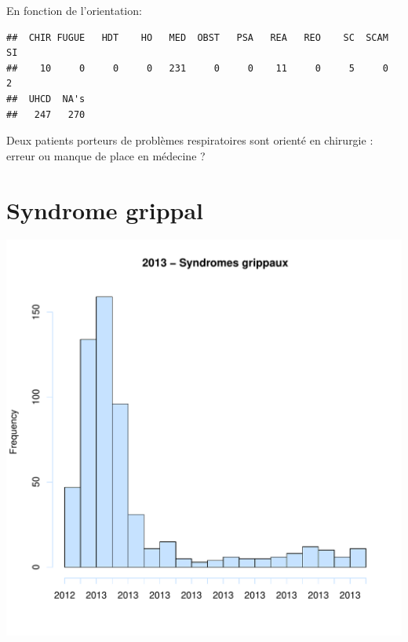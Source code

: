 \documentclass[12pt,english,french,twoside]{report}\usepackage[]{graphicx}\usepackage[]{color}
\makeatletter
\def\maxwidth{ %
  \ifdim\Gin@nat@width>\linewidth
    \linewidth
  \else
    \Gin@nat@width
  \fi
}
\newenvironment{kframe}{%
 \def\at@end@of@kframe{}%
 \ifinner\ifhmode%
  \def\at@end@of@kframe{\end{minipage}}%
  \begin{minipage}{\columnwidth}%
 \fi\fi%
 \def\FrameCommand##1{\hskip\@totalleftmargin \hskip-\fboxsep
 \colorbox{shadecolor}{##1}\hskip-\fboxsep
     \hskip-\linewidth \hskip-\@totalleftmargin \hskip\columnwidth}%
 \MakeFramed {\advance\hsize-\width
   \@totalleftmargin\z@ \linewidth\hsize
   \@setminipage}}%
 {\par\unskip\endMakeFramed%
 \at@end@of@kframe}
\newenvironment{knitrout}{}{} %
\makeatother
\begin{document}
En fonction de l'orientation:
\begin{knitrout}
\color{fgcolor}\begin{kframe}
\begin{verbatim}
##  CHIR FUGUE   HDT    HO   MED  OBST   PSA   REA   REO    SC  SCAM    SI 
##    10     0     0     0   231     0     0    11     0     5     0     2 
##  UHCD  NA's 
##   247   270
\end{verbatim}
\end{kframe}
\end{knitrout}


Deux patients porteurs de problèmes respiratoires sont orienté en chirurgie : erreur ou manque de place en médecine ?

\section{Syndrome grippal}

\begin{knitrout}
\color{fgcolor}
\includegraphics[width=\maxwidth]{figure/grippe} 

\end{knitrout}
\end{document}
